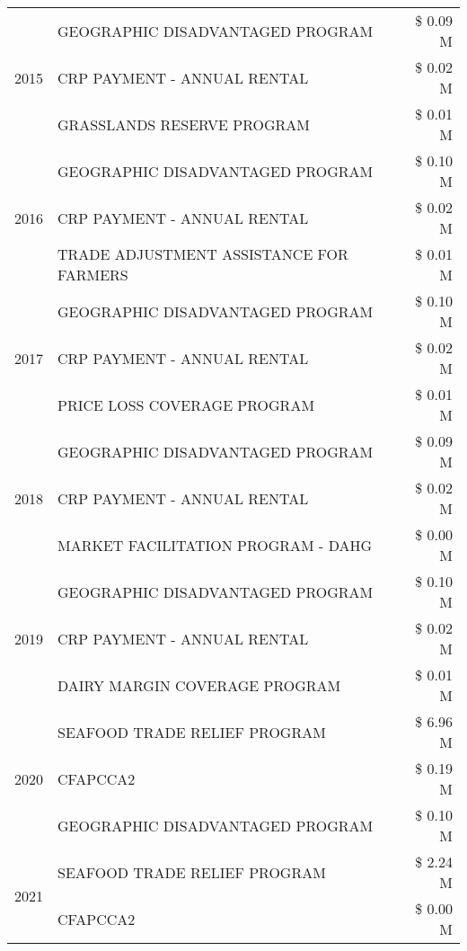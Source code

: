 \begin{tabular}{llr}
\cline{1-3}
\multirow[t]{3}{*}{2015} & GEOGRAPHIC DISADVANTAGED PROGRAM & \$ 0.09 M \\
 & CRP PAYMENT - ANNUAL RENTAL & \$ 0.02 M \\
 & GRASSLANDS RESERVE PROGRAM & \$ 0.01 M \\
\cline{1-3}
\multirow[t]{3}{*}{2016} & GEOGRAPHIC DISADVANTAGED PROGRAM              & \$ 0.10 M \\
 & CRP PAYMENT - ANNUAL RENTAL                   & \$ 0.02 M \\
 & TRADE ADJUSTMENT ASSISTANCE FOR FARMERS       & \$ 0.01 M \\
\cline{1-3}
\multirow[t]{3}{*}{2017} & GEOGRAPHIC DISADVANTAGED PROGRAM & \$ 0.10 M \\
 & CRP PAYMENT - ANNUAL RENTAL & \$ 0.02 M \\
 & PRICE LOSS COVERAGE PROGRAM & \$ 0.01 M \\
\cline{1-3}
\multirow[t]{3}{*}{2018} & GEOGRAPHIC DISADVANTAGED PROGRAM & \$ 0.09 M \\
 & CRP PAYMENT - ANNUAL RENTAL & \$ 0.02 M \\
 & MARKET FACILITATION PROGRAM - DAHG & \$ 0.00 M \\
\cline{1-3}
\multirow[t]{3}{*}{2019} & GEOGRAPHIC DISADVANTAGED PROGRAM & \$ 0.10 M \\
 & CRP PAYMENT - ANNUAL RENTAL & \$ 0.02 M \\
 & DAIRY MARGIN COVERAGE PROGRAM & \$ 0.01 M \\
\cline{1-3}
\multirow[t]{3}{*}{2020} & SEAFOOD TRADE RELIEF PROGRAM & \$ 6.96 M \\
 & CFAPCCA2 & \$ 0.19 M \\
 & GEOGRAPHIC DISADVANTAGED PROGRAM & \$ 0.10 M \\
\cline{1-3}
\multirow[t]{2}{*}{2021} & SEAFOOD TRADE RELIEF PROGRAM & \$ 2.24 M \\
 & CFAPCCA2 & \$ 0.00 M \\
\cline{1-3}
\bottomrule
\end{tabular}
